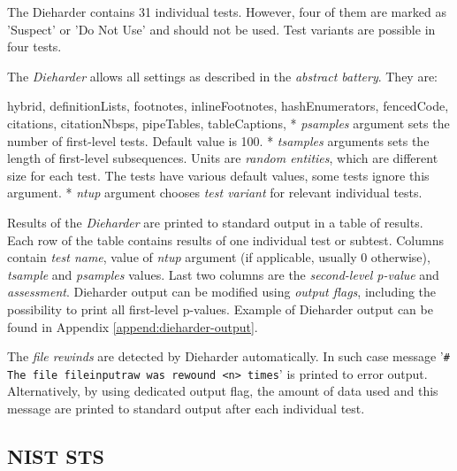 \documentclass[
  digital,     %
  oneside,     %
  nosansbold,  %
  nocolorbold, %
  nolof,         %
  nolot,         %
]{fithesis4}
\begin{document}
The Dieharder contains 31 individual tests. However, four of them are marked as 'Suspect' or 'Do Not Use' and should not be used. Test variants are possible in four tests.

The \emph{Dieharder} allows all settings as described in the \emph{abstract battery}. They are:
\begin{markdown*}{%
  hybrid,
  definitionLists,
  footnotes,
  inlineFootnotes,
  hashEnumerators,
  fencedCode,
  citations,
  citationNbsps,
  pipeTables,
  tableCaptions,
}
* \emph{psamples} argument sets the number of first-level tests. Default value is 100.
* \emph{tsamples} arguments sets the length of first-level subsequences. Units are \emph{random entities}, which are different size for each test. The tests have various default values, some tests ignore this argument.
* \emph{ntup} argument chooses \emph{test variant} for relevant individual tests.

\end{markdown*}

Results of the \emph{Dieharder} are printed to standard output in a table of results. Each row of the table contains results of one individual test or subtest. Columns contain \emph{test name}, value of \emph{ntup} argument (if applicable, usually 0 otherwise), \emph{tsample} and \emph{psamples} values. Last two columns are the \emph{second-level p-value} and \emph{assessment}. Dieharder output can be modified using \emph{output flags}, including the possibility to print all first-level p-values. Example of Dieharder output can be found in Appendix \ref{append:dieharder-output}.

The \emph{file rewinds} are detected by Dieharder automatically. In such case message '\texttt{\# The file file\textunderscore input\textunderscore raw was rewound <n> times}' is printed to error output. Alternatively, by using dedicated output flag, the amount of data used and this message are printed to standard output after each individual test.

\subsection{NIST STS} \label{chap:sols-nist}
\end{document}
